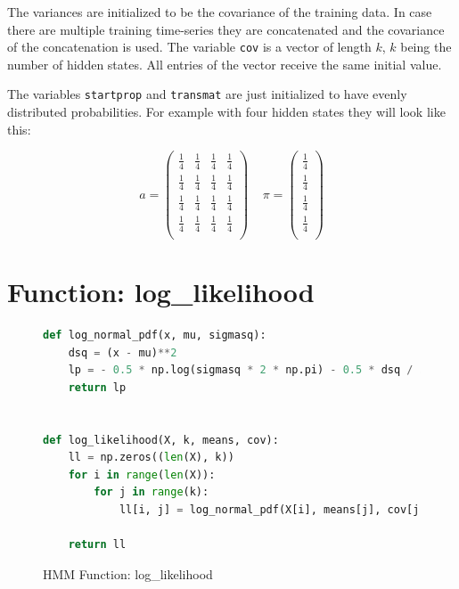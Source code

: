 The variances are initialized to be the covariance of the training data. In case there are multiple training time-series they are concatenated and the covariance of the concatenation is used. The variable \texttt{cov} is a vector of length $k$, $k$ being the number of hidden states. All entries of the vector receive the same initial value. 

The variables \texttt{startprop} and \texttt{transmat} are just initialized to have evenly distributed probabilities. For example with four hidden states they will look like this: 

\begin{equation}
a = 
\begin{pmatrix}
\frac{1}{4} & \frac{1}{4} & \frac{1}{4} & \frac{1}{4} \\
\frac{1}{4} & \frac{1}{4} & \frac{1}{4} & \frac{1}{4} \\
\frac{1}{4} & \frac{1}{4} & \frac{1}{4} & \frac{1}{4} \\
\frac{1}{4} & \frac{1}{4} & \frac{1}{4} & \frac{1}{4} \\
\end{pmatrix}
\;\;\;\;
\pi = 
\begin{pmatrix}
\frac{1}{4}  \\
\frac{1}{4}  \\
\frac{1}{4}  \\
\frac{1}{4}  \\
\end{pmatrix}
\end{equation}

\section{Function: log\_likelihood}

\begin{figure}
\begin{singlespace}
\begin{lstlisting}[language=Python]
def log_normal_pdf(x, mu, sigmasq):
    dsq = (x - mu)**2
    lp = - 0.5 * np.log(sigmasq * 2 * np.pi) - 0.5 * dsq / sigmasq
    return lp


def log_likelihood(X, k, means, cov):
    ll = np.zeros((len(X), k))
    for i in range(len(X)):
        for j in range(k):
            ll[i, j] = log_normal_pdf(X[i], means[j], cov[j])

    return ll
\end{lstlisting}
\end{singlespace}
   
\caption{HMM Function: log\_likelihood}    
\label{fig:hmm-ll-listing}
\end{figure}


